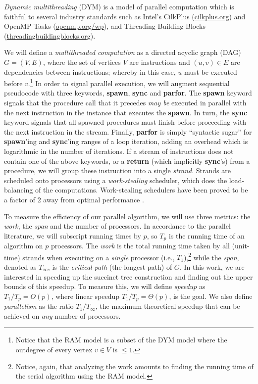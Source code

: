 {\em Dynamic multithreading} (DYM) \cite[Chapter 27]{Cormen2009} is a
model of parallel computation which is faithful to several industry standards
such as Intel's CilkPlus (\url{cilkplus.org}) and OpenMP Tasks
(\url{openmp.org/wp}), and Threading Building
Blocks (\url{threadingbuildingblocks.org}).

We will define a {\em multithreaded computation} as a directed acyclic
graph (DAG) $G=(V,E)$, where the set of vertices $V$ are instructions
and $(u,v) \in E$ are dependencies between instructions; whereby in
this case, $u$ must be executed before $v$.\footnote{Notice that the
  RAM model is a subset of the DYM model where the outdegree of every
  vertex $v \in V$ is $\leq 1$.} In order to signal parallel
execution, we will augment sequential pseudocode with three keywords,
{\bf spawn}, {\bf sync} and {\bf parfor}. The {\bf spawn} keyword
signals that the procedure call that it precedes {\em may be} executed
in parallel with the next instruction in the instance that executes
the {\bf spawn}. In turn, the {\bf sync} keyword signals that all
spawned procedures must finish before proceeding with the next
instruction in the stream. Finally, {\bf parfor} is simply ``syntactic
sugar'' for {\bf spawn}'ing and {\bf sync}'ing ranges of a loop
iteration, adding an overhead which is logarithmic in the number of
iterations. If a stream of instructions does not contain one of the
above keywords, or a {\bf return} (which implicitly {\bf sync}'s) from
a procedure, we will group these instruction into a single {\em
  strand}. Strands are scheduled onto processors using a {\em
  work-stealing} scheduler, which does the load-balancing of the
computations. Work-stealing schedulers have been proved to be a factor
of 2 away from optimal performance
\cite{Blumofe:1999:SMC:324133.324234}.

To measure the efficiency of our parallel algorithm, we
will use three metrics: the {\em work}, the {\em span} and the number
of processors. In accordance to the parallel literature, we will
subscript running times by $p$, so $T_p$ is the running time of an
algorithm on $p$ processors. The {\em work} is the total running time
taken by all (unit-time) strands when executing on a {\em single}
processor (i.e., $T_1$),\footnote{Notice, again, that analyzing the
  work amounts to finding the running time of the serial algorithm
  using the RAM model.} while the {\em span}, denoted as $T_\infty$,
is the {\em critical path} (the longest path) of $G$. In this work,
we are interested in speeding up the succinct tree construction and finding
out the upper bounds of this speedup. To measure this, we will define
{\em speedup} as $T_1/T_p = O(p)$, where linear speedup $T_1/T_p =
\Theta(p)$, is the goal. We also define {\em parallelism} as the ratio
$T_1/T_{\infty}$, the maximum theoretical speedup that can be achieved
on {\em any} number of processors.